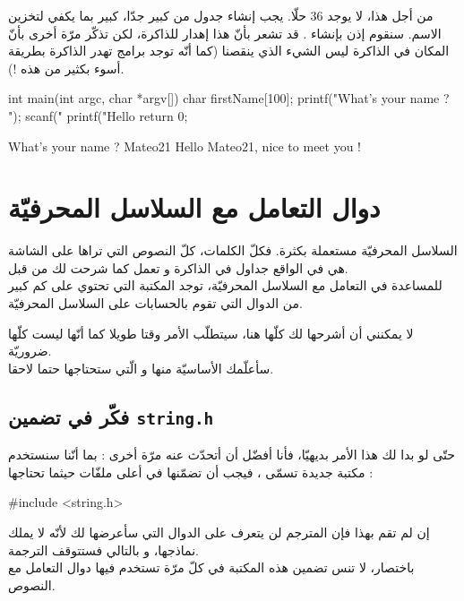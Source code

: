 من أجل هذا، لا يوجد 36 حلّا. يجب إنشاء جدول من
كبير جدّا، كبير بما يكفي لتخزين الاسم. سنقوم إذن بإنشاء
.
قد تشعر بأنّ هذا إهدار للذاكرة، لكن تذكّر مرّة أخرى بأنّ المكان في الذاكرة ليس الشيء الذي ينقصنا
(كما أنّه توجد برامج تهدر الذاكرة بطريقة أسوء بكثير من هذه !).

\begin{Csource}
int main(int argc, char *argv[])
{
	char firstName[100];
	printf("What's your name ? ");
	scanf("%
	printf("Hello %
	return 0;
}
\end{Csource}

\begin{Console}
What's your name ? Mateo21
Hello Mateo21, nice to meet you !
\end{Console}

\section{دوال التعامل مع السلاسل المحرفيّة}

السلاسل المحرفيّة مستعملة بكثرة. فكلّ الكلمات، كلّ النصوص التي تراها على الشاشة هي في الواقع جداول
في الذاكرة و تعمل كما شرحت لك من قبل.\\
للمساعدة في التعامل مع السلاسل المحرفيّة، توجد المكتبة
التي تحتوي على كم كبير من الدوال التي تقوم بالحسابات على السلاسل المحرفيّة.

لا يمكنني أن أشرحها لك كلّها هنا، سيتطلّب الأمر وقتا طويلا كما أنّها ليست كلّها ضروريّة.\\
سأعلّمك الأساسيّة منها و الّتي ستحتاجها حتما لاحقا.

\subsection{فكّر في تضمين \texttt{string.h}}

حتّى لو بدا لك هذا الأمر بديهيّا، فأنا أفضّل أن أتحدّث عنه مرّة أخرى : بما أنّنا سنستخدم مكتبة جديدة تسمّى
،
فيجب أن تضمّنها في أعلى ملفّات
حيثما تحتاجها :

\begin{Csource}
#include <string.h>
\end{Csource}

إن لم تقم بهذا فإن المترجم لن يتعرف على الدوال التي سأعرضها لك لأنّه لا يملك نماذجها، و بالتالي فستتوقف الترجمة.\\
باختصار، لا تنس تضمين هذه المكتبة في كلّ مرّة تستخدم فيها دوال التعامل مع النصوص.

